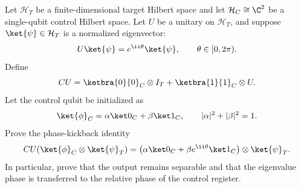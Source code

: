 Let $\mathcal H_T$ be a finite-dimensional target Hilbert space and let $\mathcal H_C\cong\C^2$ be a single-qubit control Hilbert space.  Let $U$ be a unitary on $\mathcal H_T$, and suppose $\ket{\psi}\in\mathcal H_T$ is a normalized eigenvector:
$$
    U\ket{\psi}=e^{\ii\theta}\ket{\psi},
    \qquad
    \theta\in[0,2\pi).
$$
Define
$$
    CU=\ketbra{0}{0}_C\otimes I_T+\ketbra{1}{1}_C\otimes U.
$$
Let the control qubit be initialized as
$$
    \ket{\phi}_C=\alpha\ket0_C+\beta\ket1_C,
    \qquad
    |\alpha|^2+|\beta|^2=1.
$$
Prove the phase-kickback identity
$$
    CU(\ket{\phi}_C\otimes\ket{\psi}_T)
    =
    \left(\alpha\ket0_C+\beta e^{\ii\theta}\ket1_C\right)
    \otimes\ket{\psi}_T.
$$
In particular, prove that the output remains separable and that the eigenvalue phase is transferred to the relative phase of the control register.
